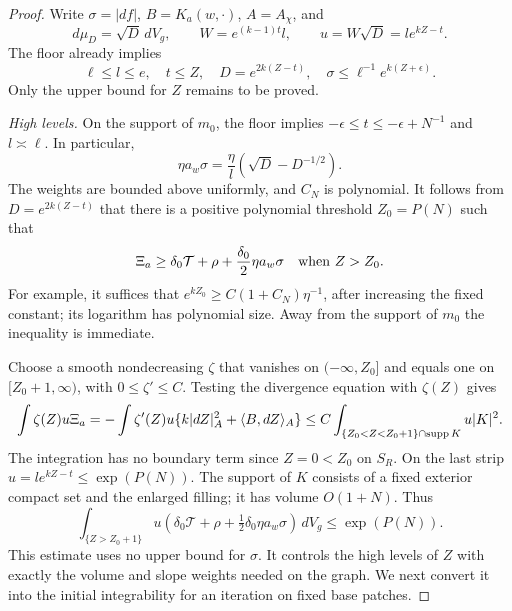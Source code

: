 \begin{proof}
Write $\sigma=|df|$, $B=K_a(w,\cdot)$, $A=A_\chi$, and
\[
 d\mu_D=\sqrt D\,dV_g,\qquad
 W=e^{(k-1)t}l,\qquad u=W\sqrt D=l e^{kZ-t}.
\]
The floor already implies
\begin{equation}\label{eq:elliptic:elementary-distortion}
 \ell\le l\le e,\quad t\le Z,\quad
 D=e^{2k(Z-t)},\quad
 \sigma\le\ell^{-1}e^{k(Z+\epsilon)}.
\end{equation}
Only the upper bound for $Z$ remains to be proved.

\medskip\noindent\emph{High levels.}
On the support of $m_0$, the floor implies
$-\epsilon\le t\le-\epsilon+N^{-1}$ and $l\asymp\ell$.
In particular,
\[
 \eta a_w\sigma=\frac\eta l(\sqrt D-D^{-1/2}).
\]
The weights are bounded above uniformly, and $C_N$ is polynomial.
It follows from $D=e^{2k(Z-t)}$ that there is a positive polynomial
threshold $Z_0=P(N)$ such that
\begin{equation}\label{eq:elliptic:high-source}
 \Xi_a\ge\delta_0\mathcal T+\rho
                   +\frac{\delta_0}2\eta a_w\sigma
 \quad\hbox{when }Z>Z_0.
\end{equation}
For example, it suffices that
$e^{kZ_0}\ge C(1+C_N)\eta^{-1}$, after increasing the fixed constant;
its logarithm has polynomial size.  Away from the support of $m_0$
the inequality is immediate.

Choose a smooth nondecreasing $\zeta$ that vanishes on $(-\infty,Z_0]$
and equals one on $[Z_0+1,\infty)$, with $0\le\zeta'\le C$.
Testing the divergence equation with $\zeta(Z)$ gives
\[
 \int \zeta(Z)u\Xi_a
  =-\int\zeta'(Z)u\{k|dZ|_A^2+\langle B,dZ\rangle_A\}
  \le C\int_{\{Z_0<Z<Z_0+1\}\cap\operatorname{supp} K}u|K|^2.
\]
The integration has no boundary term since $Z=0<Z_0$ on $S_R$.
On the last strip $u=l e^{kZ-t}\le\exp(P(N))$.
The support of $K$ consists of a fixed exterior compact set and the
enlarged filling; it has volume $O(1+N)$.  Thus
\begin{equation}\label{eq:elliptic:high-integral}
 \int_{\{Z>Z_0+1\}}u
       (\delta_0\mathcal T+\rho+\tfrac12\delta_0\eta a_w\sigma)
       \,dV_g\le\exp(P(N)).
\end{equation}
This estimate uses no upper bound for $\sigma$.  It controls the high
levels of $Z$ with exactly the volume and slope weights needed on the
graph.  We next convert it into the initial integrability for an
iteration on fixed base patches.


\end{proof}

